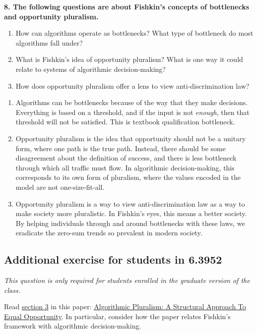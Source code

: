 \documentclass{article}
\begin{document}
\textbf{8. The following questions are about Fishkin's concepts of bottlenecks and opportunity pluralism.}
\begin{enumerate}[label=\Alph*.]
\item How can algorithms operate as bottlenecks? What type of bottleneck do most algorithms fall under?
\item What is Fishkin's idea of opportunity pluralism? What is one way it could relate to systems of algorithmic decision-making?
\item How does opportunity pluralism offer a lens to view anti-discrimination law?
\end{enumerate}

\bigskip
\begin{mdframed}
\begin{enumerate}[label=\Alph*.]
\item Algorithms can be bottlenecks because of the way that they make decisions. Everything is based on a threshold, and if the input is not \textit{enough}, then that threshold will not be satisfied. This is textbook qualification bottleneck.
\item Opportunity pluralism is the idea that opportunity should not be a unitary form, where one path is the true path. Instead, there should be some disagreement about the definition of success, and there is less bottleneck through which all traffic must flow. In algorithmic decision-making, this corresponds to its own form of pluralism, where the values encoded in the model are not one-size-fit-all.
\item Opportunity pluralism is a way to view anti-discrimination law as a way to make society more pluralistic. In Fishkin's eyes, this means a better society. By helping individuals through and around bottlenecks with these laws, we eradicate the zero-sum trends so prevalent in modern society. 
\end{enumerate}
\end{mdframed}
\bigskip

\subsection*{Additional exercise for students in 6.3952}

\textit{This question is only required for students enrolled in the graduate version of the class.}

Read \underline{section 3} in this paper: \href{https://facctconference.org/static/papers24/facct24-14.pdf}{Algorithmic Pluralism: A Structural Approach To Equal Opportunity}. In particular, consider how the paper relates Fishkin's framework with algorithmic decision-making. 
\end{document}
